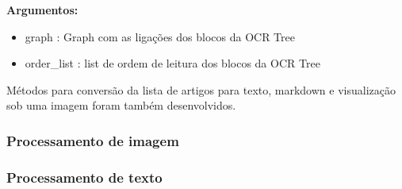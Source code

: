 \textbf{Argumentos:}
\begin{itemize}\setlength\itemsep{-0.3em}
	\item graph : Graph com as ligações dos blocos da OCR Tree
	\item order\_list : list de ordem de leitura dos blocos da OCR Tree
\end{itemize}



Métodos para conversão da lista de artigos para texto, markdown e visualização sob uma imagem foram também desenvolvidos.



\label{contribution_results_validation}



\subsubsection{Processamento de imagem}
\label{contribution_image_processing}


\label{contribution_image_rotation_correction}



\label{contribution_image_cut_argin_shadow}

\label{contribution_image_binarization}


\label{contribution_image_element_identification}



\label{contribution_image_segmentation}





\subsubsection{Processamento de texto}
\label{contribution_text_processing}

